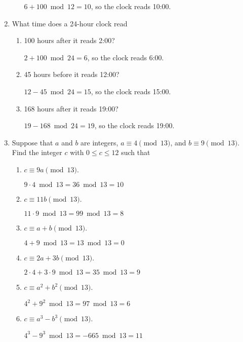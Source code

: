 \documentclass[11pt]{article}
\begin{document}
\begin{enumerate}[label=\textbf{\arabic*.}]
\begin{enumerate}[label=\textbf{\alph*)}]
		$6 + 100 \bmod 12 = 10$, so the clock reads 10:00.
	\end{enumerate}

	\item What time does a 24-hour clock read
	
	\begin{enumerate}[label=\textbf{\alph*)}]
		\item 100 hours after it reads 2:00?
		
		$2 + 100 \bmod 24 = 6$, so the clock reads 6:00.
		
		\item 45 hours before it reads 12:00?
		
		$12 - 45 \bmod 24 = 15$, so the clock reads 15:00.
		
		\item 168 hours after it reads 19:00?
		
		$19 - 168 \bmod 24 = 19$, so the clock reads 19:00.
	\end{enumerate}

	\item Suppose that $a$ and $b$ are integers, $a \equiv 4 \pmod{13}$, and $b \equiv 9 \pmod{13}$. Find the integer $c$ with $0 \leq c \leq 12$ such that
	
	\begin{enumerate}[label=\textbf{\alph*)}]
		\item $c \equiv 9a \pmod{13}$.
		
		$9 \cdot 4 \bmod 13 = 36 \bmod 13 = 10$
		
		\item $c \equiv 11b \pmod{13}$.
		
		$11 \cdot 9 \bmod 13 = 99 \bmod 13 = 8$
		
		\item $c \equiv a + b \pmod{13}$.
		
		$4 + 9 \bmod 13 = 13 \bmod 13 = 0$
		
		\item $c \equiv 2a + 3b \pmod{13}$.
		
		$2 \cdot 4 + 3 \cdot 9 \bmod 13 = 35 \bmod 13 = 9$
		
		\item $c \equiv a^2 + b^2 \pmod{13}$.
		
		$4^2 + 9^2 \bmod 13 = 97 \bmod 13 = 6$
		
		\item $c \equiv a^3 - b^3 \pmod{13}$.
		
		$4^3 - 9^3 \bmod 13 = -665 \bmod 13 = 11$
	\end{enumerate}


\end{enumerate}
\end{document}
